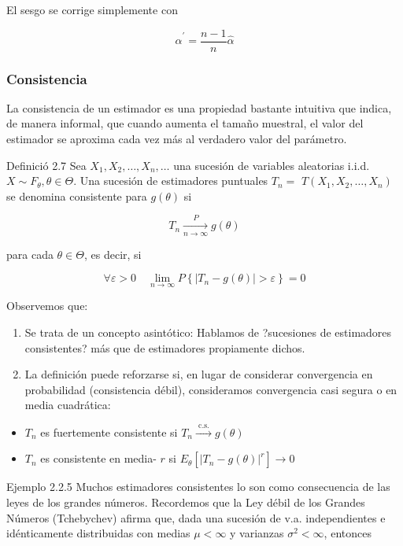 \documentclass[
]{article}
\providecommand{\tightlist}{%
  \setlength{\itemsep}{0pt}\setlength{\parskip}{0pt}}
\begin{document}
El sesgo se corrige simplemente con

\[
\hat{\alpha}^{\prime}=\frac{n-1}{n} \hat{\alpha}
\]

\subsubsection{Consistencia}\label{consistencia}

La consistencia de un estimador es una propiedad bastante intuitiva que indica, de manera informal, que cuando aumenta el tamaño muestral, el valor del estimador se aproxima cada vez más al verdadero valor del parámetro.

Definició 2.7 Sea \(X_{1}, X_{2}, \ldots, X_{n}, \ldots\) una sucesión de variables aleatorias i.i.d. \(X \sim F_{\theta}, \theta \in \Theta\). Una sucesión de estimadores puntuales \(T_{n}=\) \(T\left(X_{1}, X_{2}, \ldots, X_{n}\right)\) se denomina consistente para \(g(\theta)\) si

\[
T_{n} \xrightarrow[n \rightarrow \infty]{P} g(\theta)
\]

para cada \(\theta \in \Theta\), es decir, si

\[
\forall \varepsilon>0 \quad \lim _{n \rightarrow \infty} P\left\{\left|T_{n}-g(\theta)\right|>\varepsilon\right\}=0
\]

Observemos que:

\begin{enumerate}
\def\labelenumi{\arabic{enumi}.}
\tightlist
\item
  Se trata de un concepto asintótico: Hablamos de ?sucesiones de estimadores consistentes? más que de estimadores propiamente dichos.
\item
  La definición puede reforzarse si, en lugar de considerar convergencia en probabilidad (consistencia débil), consideramos convergencia casi segura o en media cuadrática:
\end{enumerate}

\begin{itemize}
\tightlist
\item
  \(T_{n}\) es fuertemente consistente si \(T_{n} \xrightarrow{\text { c.s. }} g(\theta)\)
\item
  \(T_{n}\) es consistente en media- \(r\) si \(E_{\theta}\left[\left|T_{n}-g(\theta)\right|^{r}\right] \longrightarrow 0\)
\end{itemize}

Ejemplo 2.2.5 Muchos estimadores consistentes lo son como consecuencia de las leyes de los grandes números. Recordemos que la Ley débil de los Grandes Números (Tchebychev) afirma que, dada una sucesión de v.a. independientes e idénticamente distribuidas con medias \(\mu<\infty\) y varianzas \(\sigma^{2}<\infty\), entonces
\end{document}
